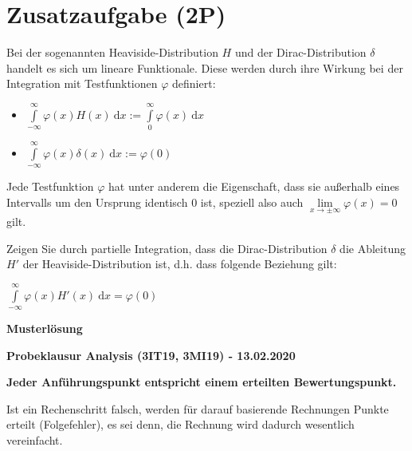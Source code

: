 \documentclass[12pt]{article}
\providecommand\d{}
\renewcommand{\d}[1]{\:\mathrm{d}{#1}}
\begin{document}
\newpage
\section*{Zusatzaufgabe (2P)}

Bei der sogenannten Heaviside-Distribution $H$ und der Dirac-Distribution $\delta$ handelt es sich um lineare Funktionale. Diese werden durch ihre Wirkung bei der Integration mit Testfunktionen $\varphi$ definiert:

\begin{itemize}
\item $\int\limits_{-\infty}^\infty \varphi(x) H(x) \d{x} := \int\limits_{0}^\infty \varphi(x) \d{x}$
\item $\int\limits_{-\infty}^\infty \varphi(x) \delta(x) \d{x} := \varphi(0)$
\end{itemize}

Jede Testfunktion $\varphi$ hat unter anderem die Eigenschaft, dass sie außerhalb eines Intervalls um den Ursprung identisch $0$ ist, speziell also auch $\lim\limits_{x\to\pm\infty} \varphi(x) = 0$ gilt.

Zeigen Sie durch partielle Integration, dass die Dirac-Distribution $\delta$ die Ableitung $H'$ der Heaviside-Distribution ist, d.h. dass folgende Beziehung gilt:

\bigskip
 
$\int\limits_{-\infty}^\infty \varphi(x) H'(x) \d{x} = \varphi(0)$

\label{LastTask}

\newpage

\begin{center}
{\bf {\large Musterlösung}}
\end{center}

\begin{center}
{\bf {\large Probeklausur Analysis (3IT19, 3MI19) - 13.02.2020}}
\end{center}

\begin{center}
\textbf{Jeder Anführungspunkt entspricht einem erteilten Bewertungspunkt.} 

Ist ein Rechenschritt falsch, werden für darauf basierende Rechnungen Punkte erteilt (Folgefehler), es sei denn, die Rechnung wird dadurch wesentlich vereinfacht. 
\end{center}
\end{document}
